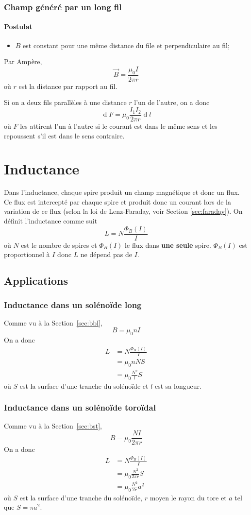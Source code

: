 \documentclass[11pt,a4paper]{article}
\newcommand{\B}{\vec B}
\DeclareMathOperator{\diff}{d}
\newcommand{\dif}{\diff\!}
\begin{document}
\subsubsection{Champ généré par un long fil}
\paragraph{Postulat}
\begin{itemize}
	\item $B$ est constant pour une même distance du file et perpendiculaire au fil;
\end{itemize}
Par Ampère,
\[ \B = \frac{\mu_0I}{2\pi r} \]
où $r$ est la distance par rapport au fil.

Si on a deux fils parallèles à une distance $r$ l'un de l'autre, on a donc
\[ \dif F = \mu_0\frac{I_1I_2}{2\pi r}\dif l \]
où $F$ les attirent l'un à l'autre si le courant est dans le même sens et les repoussent s'il est dans le sens contraire.

\section{Inductance}
Dans l'inductance, chaque spire produit un champ magnétique et donc un flux.
Ce flux est intercepté par chaque spire et produit donc un courant lors de la variation de ce flux (selon la loi de Lenz-Faraday, voir Section \ref{sec:faraday}).
On définit l'inductance comme suit
\[ L = N\frac{\Phi_B(I)}{I} \]
où $N$ est le nombre de spires et $\Phi_B(I)$ le flux dans \textbf{une seule} spire.
$\Phi_B(I)$ est proportionnel à $I$ donc $L$ ne dépend pas de $I$.

\subsection{Applications}
\subsubsection{Inductance dans un solénoïde long}
Comme vu à la Section~\ref{sec:bbl},
\[ B = \mu_0nI \]
On a donc
\begin{align*}
	L &= N\frac{\Phi_B(I)}{I}\\
	&= \mu_0 nNS\\
	&= \mu_0 \frac{N^2}{l}S
\end{align*}
où $S$ est la surface d'une tranche du solénoïde et $l$ est sa longueur.

\subsubsection{Inductance dans un solénoïde toroïdal}
Comme vu à la Section~\ref{sec:bst},
\[ B = \mu_0\frac{NI}{2\pi r} \]
On a donc
\begin{align*}
	L &= N\frac{\Phi_B(I)}{I}\\
	&= \mu_0 \frac{N^2}{2\pi r}S\\
	&= \mu_0 \frac{N^2}{2r}a^2
\end{align*}
où $S$ est la surface d'une tranche du solénoïde, $r$ moyen le rayon du tore et $a$ tel que $S = \pi a^2$.
\end{document}
